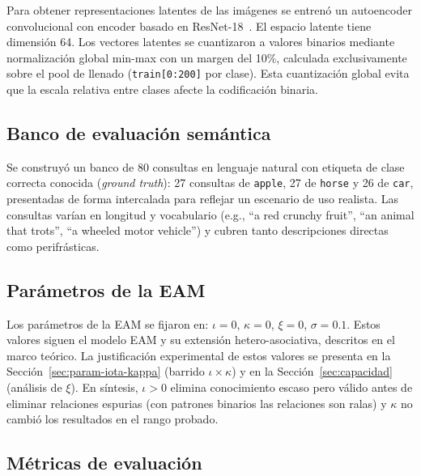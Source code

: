 Para obtener representaciones latentes de las imágenes se entrenó un autoencoder convolucional con encoder basado en ResNet-18~\cite{he2016resnet}.
El espacio latente tiene dimensión 64.
Los vectores latentes se cuantizaron a valores binarios mediante normalización global min-max con un margen del 10\%, calculada exclusivamente sobre el pool de llenado (\texttt{train[0:200]} por clase).
Esta cuantización global evita que la escala relativa entre clases afecte la codificación binaria.

\subsection{Banco de evaluación semántica}
\label{sec:banco}

Se construyó un banco de 80 consultas en lenguaje natural con etiqueta de clase correcta conocida (\textit{ground truth}): 27 consultas de \texttt{apple}, 27 de \texttt{horse} y 26 de \texttt{car}, presentadas de forma intercalada para reflejar un escenario de uso realista.
Las consultas varían en longitud y vocabulario (e.g., ``a red crunchy fruit'', ``an animal that trots'', ``a wheeled motor vehicle'') y cubren tanto descripciones directas como perifrásticas.

\subsection{Parámetros de la EAM}
\label{sec:parametros}

Los parámetros de la EAM se fijaron en:
$\iota = 0$, $\kappa = 0$, $\xi = 0$, $\sigma = 0.1$.
Estos valores siguen el modelo EAM y su extensión hetero-asociativa,
descritos en el marco teórico.
La justificación experimental de estos valores se presenta en la Sección~\ref{sec:param-iota-kappa} (barrido $\iota \times \kappa$) y en la Sección~\ref{sec:capacidad} (análisis de $\xi$).
En síntesis, $\iota > 0$ elimina conocimiento escaso pero válido antes de eliminar relaciones espurias (con patrones binarios las relaciones son ralas) y $\kappa$ no cambió los resultados en el rango probado.

\subsection{Métricas de evaluación}
\label{sec:metricas}

